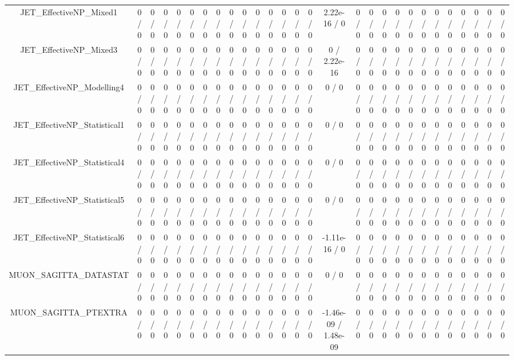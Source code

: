 \documentclass[10pt]{article}
\begin{document}
\begin{table}[htbp]
\begin{center}
\begin{tabular}{|c|c|c|c|c|c|c|c|c|c|c|c|c|c|c|c|c|c|c|c|c|c|c|c|c|c|c|c|}
  JET_EffectiveNP_Mixed1 & 0 / 0 & 0 / 0 & 0 / 0 & 0 / 0 & 0 / 0 & 0 / 0 & 0 / 0 & 0 / 0 & 0 / 0 & 0 / 0 & 0 / 0 & 0 / 0 & 0 / 0 & 0 / 0 & 2.22e-16 / 0 & 0 / 0 & 0 / 0 & 0 / 0 & 0 / 0 & 0 / 0 & 0 / 0 & 0 / 0 & 0 / 0 & 0 / 0 & 0 / 0 & 0 / 0 & 0 / 0 \\ 
  JET_EffectiveNP_Mixed3 & 0 / 0 & 0 / 0 & 0 / 0 & 0 / 0 & 0 / 0 & 0 / 0 & 0 / 0 & 0 / 0 & 0 / 0 & 0 / 0 & 0 / 0 & 0 / 0 & 0 / 0 & 0 / 0 & 0 / 2.22e-16 & 0 / 0 & 0 / 0 & 0 / 0 & 0 / 0 & 0 / 0 & 0 / 0 & 0 / 0 & 0 / 0 & 0 / 0 & 0 / 0 & 0 / 0 & 0 / 0 \\ 
  JET_EffectiveNP_Modelling4 & 0 / 0 & 0 / 0 & 0 / 0 & 0 / 0 & 0 / 0 & 0 / 0 & 0 / 0 & 0 / 0 & 0 / 0 & 0 / 0 & 0 / 0 & 0 / 0 & 0 / 0 & 0 / 0 & 0 / 0 & 0 / 0 & 0 / 0 & 0 / 0 & 0 / 0 & 0 / 0 & 0 / 0 & 0 / 0 & 0 / 0 & 0 / 0 & 0 / 0 & 0 / 0 & 0 / 0 \\ 
  JET_EffectiveNP_Statistical1 & 0 / 0 & 0 / 0 & 0 / 0 & 0 / 0 & 0 / 0 & 0 / 0 & 0 / 0 & 0 / 0 & 0 / 0 & 0 / 0 & 0 / 0 & 0 / 0 & 0 / 0 & 0 / 0 & 0 / 0 & 0 / 0 & 0 / 0 & 0 / 0 & 0 / 0 & 0 / 0 & 0 / 0 & 0 / 0 & 0 / 0 & 0 / 0 & 0 / 0 & 0 / 0 & 0 / 0 \\ 
  JET_EffectiveNP_Statistical4 & 0 / 0 & 0 / 0 & 0 / 0 & 0 / 0 & 0 / 0 & 0 / 0 & 0 / 0 & 0 / 0 & 0 / 0 & 0 / 0 & 0 / 0 & 0 / 0 & 0 / 0 & 0 / 0 & 0 / 0 & 0 / 0 & 0 / 0 & 0 / 0 & 0 / 0 & 0 / 0 & 0 / 0 & 0 / 0 & 0 / 0 & 0 / 0 & 0 / 0 & 0 / 0 & 0 / 0 \\ 
  JET_EffectiveNP_Statistical5 & 0 / 0 & 0 / 0 & 0 / 0 & 0 / 0 & 0 / 0 & 0 / 0 & 0 / 0 & 0 / 0 & 0 / 0 & 0 / 0 & 0 / 0 & 0 / 0 & 0 / 0 & 0 / 0 & 0 / 0 & 0 / 0 & 0 / 0 & 0 / 0 & 0 / 0 & 0 / 0 & 0 / 0 & 0 / 0 & 0 / 0 & 0 / 0 & 0 / 0 & 0 / 0 & 0 / 0 \\ 
  JET_EffectiveNP_Statistical6 & 0 / 0 & 0 / 0 & 0 / 0 & 0 / 0 & 0 / 0 & 0 / 0 & 0 / 0 & 0 / 0 & 0 / 0 & 0 / 0 & 0 / 0 & 0 / 0 & 0 / 0 & 0 / 0 & -1.11e-16 / 0 & 0 / 0 & 0 / 0 & 0 / 0 & 0 / 0 & 0 / 0 & 0 / 0 & 0 / 0 & 0 / 0 & 0 / 0 & 0 / 0 & 0 / 0 & 0 / 0 \\ 
  MUON_SAGITTA_DATASTAT & 0 / 0 & 0 / 0 & 0 / 0 & 0 / 0 & 0 / 0 & 0 / 0 & 0 / 0 & 0 / 0 & 0 / 0 & 0 / 0 & 0 / 0 & 0 / 0 & 0 / 0 & 0 / 0 & 0 / 0 & 0 / 0 & 0 / 0 & 0 / 0 & 0 / 0 & 0 / 0 & 0 / 0 & 0 / 0 & 0 / 0 & 0 / 0 & 0 / 0 & 0 / 0 & 0 / 0 \\ 
  MUON_SAGITTA_PTEXTRA & 0 / 0 & 0 / 0 & 0 / 0 & 0 / 0 & 0 / 0 & 0 / 0 & 0 / 0 & 0 / 0 & 0 / 0 & 0 / 0 & 0 / 0 & 0 / 0 & 0 / 0 & 0 / 0 & -1.46e-09 / 1.48e-09 & 0 / 0 & 0 / 0 & 0 / 0 & 0 / 0 & 0 / 0 & 0 / 0 & 0 / 0 & 0 / 0 & 0 / 0 & 0 / 0 & 0 / 0 & 0 / 0 \\ 

\end{tabular}
\end{center}
\end{table}
\end{document}
